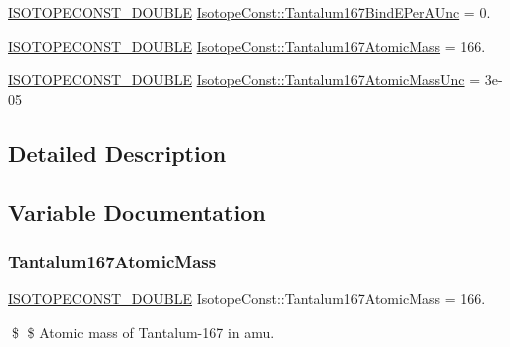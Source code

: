 \begin{DoxyCompactItemize}
\mbox{\hyperlink{group___isotope_const-_macros_ga8f45a7272ce02c0b4c65c44636ed719a}{I\+S\+O\+T\+O\+P\+E\+C\+O\+N\+S\+T\+\_\+\+D\+O\+U\+B\+LE}} \mbox{\hyperlink{group___isotope_const-_tantalum-_ta167_gab4d799d72ac4e7ccc2010ccb1f1bfb0c}{Isotope\+Const\+::\+Tantalum167\+Bind\+E\+Per\+A\+Unc}} = 0.
\item 
\mbox{\hyperlink{group___isotope_const-_macros_ga8f45a7272ce02c0b4c65c44636ed719a}{I\+S\+O\+T\+O\+P\+E\+C\+O\+N\+S\+T\+\_\+\+D\+O\+U\+B\+LE}} \mbox{\hyperlink{group___isotope_const-_tantalum-_ta167_ga656874b55f2fed789480ac95ec40374c}{Isotope\+Const\+::\+Tantalum167\+Atomic\+Mass}} = 166.
\item 
\mbox{\hyperlink{group___isotope_const-_macros_ga8f45a7272ce02c0b4c65c44636ed719a}{I\+S\+O\+T\+O\+P\+E\+C\+O\+N\+S\+T\+\_\+\+D\+O\+U\+B\+LE}} \mbox{\hyperlink{group___isotope_const-_tantalum-_ta167_gaae34fa520dacccd6c3b87b6b77cffd37}{Isotope\+Const\+::\+Tantalum167\+Atomic\+Mass\+Unc}} = 3e-\/05
\end{DoxyCompactItemize}


\subsection{Detailed Description}


\subsection{Variable Documentation}
\mbox{\label{group___isotope_const-_tantalum-_ta167_ga656874b55f2fed789480ac95ec40374c}} 
\subsubsection{\texorpdfstring{Tantalum167\+Atomic\+Mass}{Tantalum167AtomicMass}}
{\footnotesize\ttfamily \mbox{\hyperlink{group___isotope_const-_macros_ga8f45a7272ce02c0b4c65c44636ed719a}{I\+S\+O\+T\+O\+P\+E\+C\+O\+N\+S\+T\+\_\+\+D\+O\+U\+B\+LE}} Isotope\+Const\+::\+Tantalum167\+Atomic\+Mass = 166.}

\$ \$ Atomic mass of Tantalum-\/167 in amu. \mbox{\label{group___isotope_const-_tantalum-_ta167_gaae34fa520dacccd6c3b87b6b77cffd37}} 

